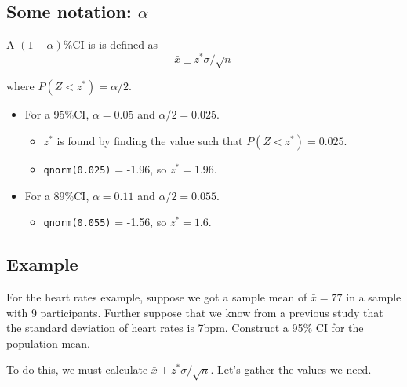 \documentclass[
  letterpaper,
  DIV=11,
  numbers=noendperiod,
  oneside]{scrreprt}
\providecommand{\tightlist}{%
  \setlength{\itemsep}{0pt}\setlength{\parskip}{0pt}}\usepackage{longtable,booktabs,array}
\begin{document}
\hypertarget{some-notation-alpha}{%
\subsection{\texorpdfstring{Some notation:
\(\alpha\)}{Some notation: \textbackslash alpha}}\label{some-notation-alpha}}

A \((1-\alpha)\%\)CI is is defined as \[
\bar x \pm z^*\sigma/\sqrt{n}
\]

where \(P(Z < z^*) = \alpha/2\).\newline

\begin{itemize}
\tightlist
\item
  For a 95\%CI, \(\alpha = 0.05\) and \(\alpha/2= 0.025\).

  \begin{itemize}
  \tightlist
  \item
    \(z^*\) is found by finding the value such that
    \(P(Z < z^*) = 0.025\).
  \item
    \texttt{qnorm(0.025)} = -1.96, so \(z^* = 1.96\).
  \end{itemize}
\item
  For a 89\%CI, \(\alpha = 0.11\) and \(\alpha/2 = 0.055\).

  \begin{itemize}
  \tightlist
  \item
    \texttt{qnorm(0.055)} = -1.56, so \(z^* = 1.6\).
  \end{itemize}
\end{itemize}

\hypertarget{example-3}{%
\subsection{Example}\label{example-3}}

For the heart rates example, suppose we got a sample mean of
\(\bar x = 77\) in a sample with 9 participants. Further suppose that we
know from a previous study that the standard deviation of heart rates is
7bpm. Construct a 95\% CI for the population mean.

To do this, we must calculate \(\bar x \pm z^*\sigma/\sqrt{n}\). Let's
gather the values we need.
\end{document}
